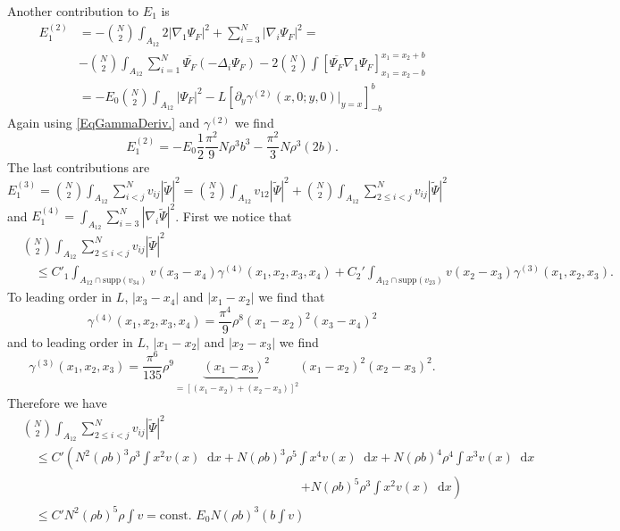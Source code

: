 \documentclass[a4paper,11pt]{article}
\newcommand{\supp}{\text{supp}}
\newcommand{\abs}[1]{\left\lvert #1 \right\rvert}
\newcommand*\diff{\mathop{}\!\mathrm{d}}
\numberwithin{equation}{section}
\begin{document}
	Another contribution to $ E_1 $ is \begin{equation}
	\begin{aligned}
	E_1^{(2)}&=-\binom{N}{2}\int_{A_{12}}2\abs{\nabla_1\Psi_F}^2+\sum_{i=3}^{N}\abs{\nabla_i\Psi_F}^2=\\&-\binom{N}{2}\int_{A_{12}}\sum_{i=1}^{N}\overline{\Psi_F}(-\Delta_i\Psi_F)-2\binom{N}{2}\int\left[\overline{\Psi_F}\nabla_1\Psi_F\right]_{x_1=x_2-b}^{x_1=x_2+b}\\
	&=-E_0\binom{N}{2}\int_{A_{12}}\abs{\Psi_F}^2-L\left[\partial_y\gamma^{(2)}(x,0;y,0)\vert_{y=x}\right]_{-b}^{b}
	\end{aligned}
	\end{equation}
	Again using \eqref{EqGammaDeriv.} and $ \gamma^{(2)} $ we find \begin{equation}
	E_1^{(2)}=-E_0\frac{1}{2}\frac{\pi^2}{9}N\rho^3b^3-\frac{\pi^2}{3}N\rho^3 (2b).
	\end{equation}
	The last contributions are $ E^{(3)}_1=\binom{N}{2}\int_{A_{12}} \sum_{i<j}^{N}v_{ij}\abs{\tilde{\Psi}}^2=\binom{N}{2}\int_{A_{12}}v_{12}\abs{\tilde{\Psi}}^2+\binom{N}{2}\int_{A_{12}} \sum_{2\leq i<j}^{N}v_{ij}\abs{\tilde{\Psi}}^2 $ and $ E_1^{(4)}=\int_{A_{12}}\sum_{i=3}^{N}\abs{\nabla_i\tilde{\Psi}}^2 $.
	First we notice that \begin{equation}
	\begin{aligned}
	&\binom{N}{2}\int_{A_{12}} \sum_{2\leq i<j}^{N}v_{ij}\abs{\tilde{\Psi}}^2\\&\quad\leq C'_1\int_{A_{12}\cap\supp(v_{34})}v(x_3-x_4)\gamma^{(4)}(x_1,x_2,x_3,x_4)+C_2'\int_{A_{12}\cap\supp(v_{23})}v(x_2-x_3)\gamma^{(3)}(x_1,x_2,x_3).
	\end{aligned}
	\end{equation}
	To leading order in $ L $, $ \abs{x_3-x_4} $ and $ \abs{x_1-x_2} $ we find that \begin{equation}
	\gamma^{(4)}(x_1,x_2,x_3,x_4)=\frac{\pi^4}{9}\rho^8(x_1-x_2)^2(x_3-x_4)^2
	\end{equation}
	and to leading order in $ L $, $ \abs{x_1-x_2} $ and $ \abs{x_2-x_3} $ we find \begin{equation}
	\gamma^{(3)}(x_1,x_2,x_3)=\frac{\pi^6}{135}\rho^9\underbrace{(x_1-x_3)^2}_{=[(x_1-x_2)+(x_2-x_3)]^2}(x_1-x_2)^2(x_2-x_3)^2.
	\end{equation}
	Therefore we have
	\begin{equation}
	\begin{aligned}
	&\binom{N}{2}\int_{A_{12}} \sum_{2\leq i<j}^{N}v_{ij}\abs{\tilde{\Psi}}^2\\&\quad\leq C' \left(N^2(\rho b)^3\rho^3\int x^2 v(x)\diff x+N(\rho b)^3 \rho^5 \int x^4 v(x)\diff x+N(\rho b)^4\rho^4 \int x^3 v(x)\diff x\right.\\
	&\qquad \qquad \qquad \qquad\hspace{6cm}\left.+N(\rho b)^5 \rho^3 \int x^2 v(x)\diff x\right)\\
	&\quad \leq C' N^2(\rho b)^5\rho \int v=\text{const. }E_0 N (\rho b)^3 \left(b\int v\right)
	\end{aligned}
	\end{equation}
\end{document}
